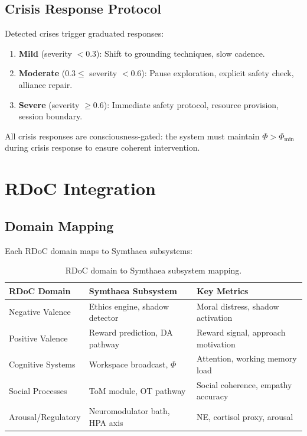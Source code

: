 \documentclass[11pt,a4paper]{article}
\begin{document}
\subsection{Crisis Response Protocol}

Detected crises trigger graduated responses:

\begin{enumerate}[nosep]
    \item \textbf{Mild} (severity $< 0.3$): Shift to grounding techniques, slow cadence.
    \item \textbf{Moderate} ($0.3 \leq$ severity $< 0.6$): Pause exploration, explicit safety check, alliance repair.
    \item \textbf{Severe} (severity $\geq 0.6$): Immediate safety protocol, resource provision, session boundary.
\end{enumerate}

All crisis responses are consciousness-gated: the system must maintain $\Phi > \Phi_{\min}$ during crisis response to ensure coherent intervention.

\section{RDoC Integration}

\subsection{Domain Mapping}

Each RDoC domain maps to Symthaea subsystems:

\begin{table}[h]
\centering
\caption{RDoC domain to Symthaea subsystem mapping.}
\label{tab:rdoc}
\begin{tabular}{@{}lll@{}}
\toprule
RDoC Domain & Symthaea Subsystem & Key Metrics \\
\midrule
Negative Valence & Ethics engine, shadow detector & Moral distress, shadow activation \\
Positive Valence & Reward prediction, DA pathway & Reward signal, approach motivation \\
Cognitive Systems & Workspace broadcast, $\Phi$ & Attention, working memory load \\
Social Processes & ToM module, OT pathway & Social coherence, empathy accuracy \\
Arousal/Regulatory & Neuromodulator bath, HPA axis & NE, cortisol proxy, arousal \\
\bottomrule
\end{tabular}
\end{table}
\end{document}
